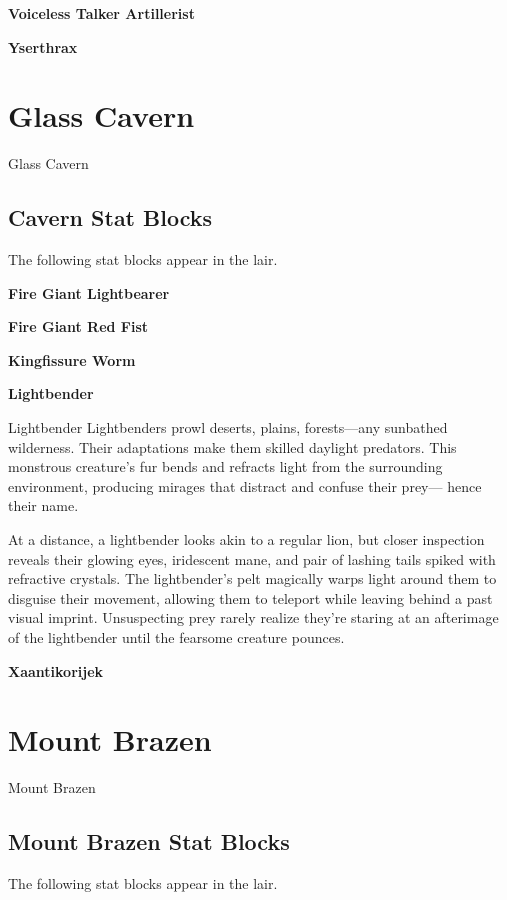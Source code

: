 \documentclass[10pt,a4paper,twoside,bg=print,twocolumn,openany,nodeprecatedcode]{dndbook}
\begin{document}
\textbf{Voiceless Talker Artillerist}

\textbf{Yserthrax}

\chapter{Glass Cavern}
Glass Cavern

\section{Cavern Stat Blocks}
The following stat blocks appear in the lair.

\textbf{Fire Giant Lightbearer}

\textbf{Fire Giant Red Fist}

\textbf{Kingfissure Worm}

\textbf{Lightbender}

\begin{DndSidebar}[float=!b]{Lightbender}
Lightbenders prowl deserts, plains, forests—any sunbathed wilderness. Their adaptations make them skilled daylight predators. This monstrous creature's fur bends and refracts light from the surrounding environment, producing mirages that distract and confuse their prey— hence their name.



At a distance, a lightbender looks akin to a regular lion, but closer inspection reveals their glowing eyes, iridescent mane, and pair of lashing tails spiked with refractive crystals. The lightbender's pelt magically warps light around them to disguise their movement, allowing them to teleport while leaving behind a past visual imprint. Unsuspecting prey rarely realize they're staring at an afterimage of the lightbender until the fearsome creature pounces.



\end{DndSidebar}

\textbf{Xaantikorijek}

\chapter{Mount Brazen}
Mount Brazen

\section{Mount Brazen Stat Blocks}
The following stat blocks appear in the lair.
\end{document}
